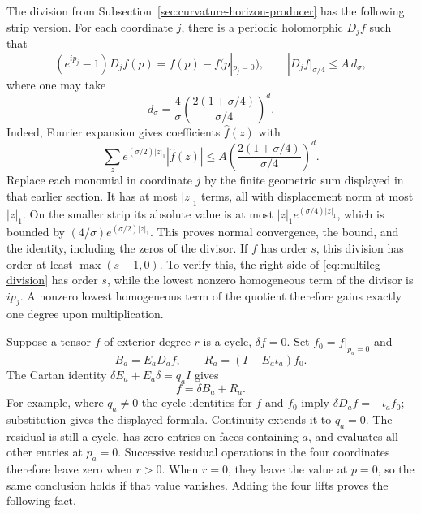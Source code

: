 The division from Subsection~\ref{sec:curvature-horizon-producer}
has the following strip version. For each coordinate $j$, there
is a periodic holomorphic $D_j f$ such that
\begin{equation}\label{eq:multileg-division}
 (e^{ip_j}-1)D_jf(p)=f(p)-f(p|_{p_j=0}),
 \qquad
 |D_jf|_{\sigma/4}\le A\,d_\sigma,
\end{equation}
where one may take
\[
 d_\sigma=\frac4\sigma
       \left(\frac{2(1+\sigma/4)}{\sigma/4}\right)^d.
\]
Indeed, Fourier expansion gives coefficients $\widehat f(z)$ with
\[
 \sum_z e^{(\sigma/2)|z|_1}|\widehat f(z)|
 \le A\left(\frac{2(1+\sigma/4)}{\sigma/4}\right)^d.
\]
Replace each monomial in coordinate $j$ by the finite geometric
sum displayed in that earlier section. It has at most $|z|_1$
terms, all with displacement norm at most $|z|_1$. On the smaller
strip its absolute value is at most
$|z|_1e^{(\sigma/4)|z|_1}$, which is bounded by
$(4/\sigma)e^{(\sigma/2)|z|_1}$. This proves normal convergence,
the bound, and the identity, including the zeros of the divisor.
If $f$ has order $s$, this division has order at least
$\max(s-1,0)$. To verify this, the right side of
\eqref{eq:multileg-division} has order $s$, while the lowest
nonzero homogeneous term of the divisor is $ip_j$. A nonzero
lowest homogeneous term of the quotient therefore gains exactly
one degree upon multiplication.

Suppose a tensor $f$ of exterior degree $r$ is a cycle,
$\delta f=0$. Set $f_0=f|_{p_a=0}$ and
\[
 B_a=E_aD_af,\qquad R_a=(I-E_a\iota_a)f_0.
\]
The Cartan identity $\delta E_a+E_a\delta=q_a I$ gives
\begin{equation}\label{eq:multileg-axis}
                  f=\delta B_a+R_a.
\end{equation}
For example, where $q_a\ne0$ the cycle identities for $f$ and
$f_0$ imply $\delta D_af=-\iota_af_0$; substitution gives the
displayed formula. Continuity extends it to $q_a=0$.
The residual is still a cycle, has zero entries on faces containing
$a$, and evaluates all other entries at $p_a=0$.
Successive residual operations in the four coordinates therefore
leave zero when $r>0$. When $r=0$, they leave the value at $p=0$,
so the same conclusion holds if that value vanishes. Adding the
four lifts proves the following fact.

